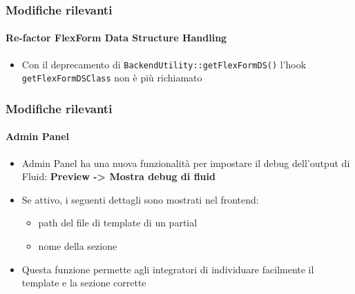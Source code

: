 \begin{frame}[fragile]
	\frametitle{Modifiche rilevanti}
	\framesubtitle{Re-factor FlexForm Data Structure Handling}


	\begin{itemize}
		\item Con il deprecamento di \texttt{BackendUtility::getFlexFormDS()} l'hook
			\texttt{getFlexFormDSClass} non è più richiamato

	\end{itemize}

\end{frame}





\begin{frame}[fragile]
	\frametitle{Modifiche rilevanti}
	\framesubtitle{Admin Panel}

	\begin{itemize}
		\item Admin Panel ha una nuova funzionalità per impostare il debug dell'output di Fluid:\newline
			\textbf{Preview -> Mostra debug di fluid}
		\item Se attivo, i seguenti dettagli sono mostrati nel frontend:

			\begin{itemize}
				\item path del file di template di un partial
				\item nome della sezione
			\end{itemize}

		\item Questa funzione permette agli integratori di individuare facilmente il template e la sezione corrette

	\end{itemize}

\end{frame}






